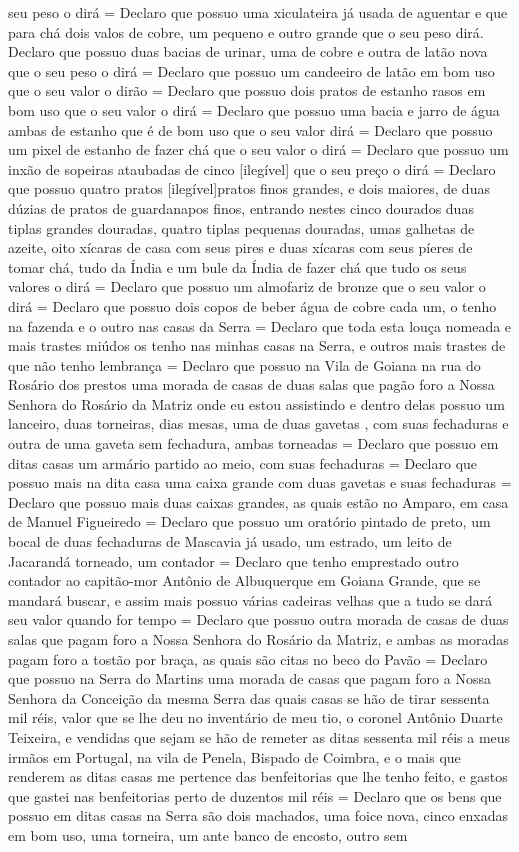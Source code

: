 \begin{refsection}
seu peso o dirá = Declaro que possuo uma xiculateira já usada de aguentar e que para chá dois valos de cobre, um pequeno e outro grande que o seu peso dirá. Declaro que possuo duas bacias de urinar, uma de cobre e outra de latão nova que o seu peso o dirá = Declaro que possuo um candeeiro de latão em bom uso que o seu valor o dirão = Declaro que possuo dois pratos de estanho rasos em bom uso que o seu valor o dirá = Declaro que possuo uma bacia e jarro de água ambas de estanho que é de bom uso que o seu valor dirá = Declaro que possuo um pixel de estanho de fazer chá que o seu valor o dirá = Declaro que possuo um inxão de sopeiras ataubadas de cinco [ilegível] que o seu preço o dirá = Declaro que possuo quatro pratos [ilegível]pratos finos grandes, e dois maiores, de duas dúzias de pratos de guardanapos finos, entrando nestes cinco dourados duas tiplas grandes douradas, quatro tiplas pequenas douradas, umas galhetas de azeite, oito xícaras de casa com seus pires e duas xícaras com seus píeres de tomar chá, tudo da Índia e um bule da Índia de fazer chá que tudo os seus valores o dirá = Declaro que possuo um almofariz de bronze que o seu valor o dirá = Declaro que possuo dois copos de beber água de cobre cada um, o tenho na fazenda e o outro nas  casas da Serra = Declaro que toda esta louça nomeada e mais trastes miúdos os tenho nas minhas casas na Serra, e outros mais trastes de que não tenho lembrança = Declaro que possuo na Vila de Goiana na rua do Rosário dos prestos uma morada de casas de duas salas que pagão foro a Nossa Senhora do Rosário da Matriz onde eu estou assistindo e dentro delas possuo um lanceiro, duas torneiras, dias mesas, uma de duas gavetas , com suas fechaduras e outra de uma gaveta sem fechadura, ambas torneadas = Declaro que possuo em ditas casas um armário partido ao meio, com suas fechaduras = Declaro que possuo mais na dita casa uma caixa grande com duas gavetas e suas fechaduras = Declaro que possuo mais duas caixas grandes, as quais estão no Amparo, em casa de Manuel Figueiredo = Declaro que possuo um oratório pintado de preto, um bocal de duas fechaduras de Mascavia já usado, um estrado, um leito de Jacarandá torneado, um contador = Declaro que tenho emprestado outro contador ao capitão-mor Antônio de Albuquerque em Goiana Grande, que se mandará buscar, e assim mais possuo várias cadeiras velhas que a tudo se dará seu valor quando for tempo = Declaro que possuo outra morada de casas de duas salas que pagam foro a Nossa Senhora do Rosário da Matriz, e ambas as moradas pagam foro a tostão por braça, as quais são citas no beco do Pavão = Declaro que possuo na Serra do Martins uma morada de casas que pagam foro a Nossa Senhora da Conceição da mesma Serra das quais casas se hão de tirar sessenta mil réis, valor que se lhe deu no inventário de meu tio, o coronel Antônio Duarte Teixeira, e vendidas que sejam se hão de remeter as ditas sessenta mil réis a meus irmãos em Portugal, na vila de Penela, Bispado de Coimbra, e o mais que renderem as ditas casas me pertence das benfeitorias que lhe tenho feito, e gastos que gastei nas benfeitorias perto de duzentos mil réis = Declaro que os bens que possuo em ditas casas na Serra são dois machados, uma foice nova, cinco enxadas em bom uso, uma torneira, um ante banco de encosto, outro sem 
\end{refsection}

